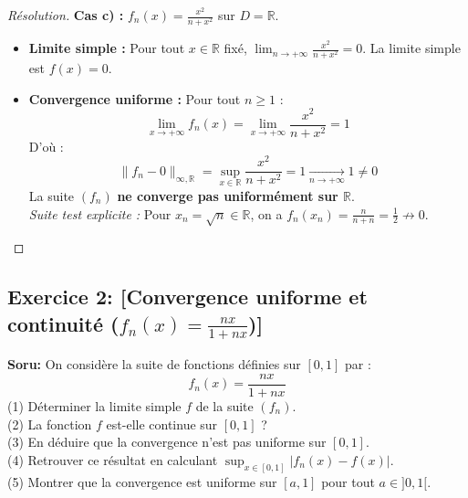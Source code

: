 \documentclass[12pt,a4paper]{report}
\begin{document}
\begin{proof}[Résolution]
\textbf{Cas c) :} $f_n(x) = \frac{x^2}{n+x^2}$ sur $D = \mathbb{R}$.
\begin{itemize}
    \item \textbf{Limite simple :}
    Pour tout $x \in \mathbb{R}$ fixé, $\lim_{n \to +\infty} \frac{x^2}{n+x^2} = 0$.
    La limite simple est $f(x) = 0$.
    \item \textbf{Convergence uniforme :}
    Pour tout $n \ge 1$ :
    \[ \lim_{x \to +\infty} f_n(x) = \lim_{x \to +\infty} \frac{x^2}{n+x^2} = 1 \]
    D'où :
    \[ \|f_n - 0\|_{\infty, \mathbb{R}} = \sup_{x \in \mathbb{R}} \frac{x^2}{n+x^2} = 1 \xrightarrow[n \to +\infty]{} 1 \neq 0 \]
    La suite $(f_n)$ \textbf{ne converge pas uniformément sur $\mathbb{R}$}.\\
    \textit{Suite test explicite :} Pour $x_n = \sqrt{n} \in \mathbb{R}$, on a $f_n(x_n) = \frac{n}{n+n} = \frac{1}{2} \not\to 0$.
\end{itemize}
\end{proof}

\subsection*{Exercice 2: [Convergence uniforme et continuité ($f_n(x) = \frac{nx}{1+nx}$)]}

\textbf{Soru:}
On considère la suite de fonctions définies sur $[0, 1]$ par :
\[ f_n(x) = \frac{nx}{1+nx} \]
(1) Déterminer la limite simple $f$ de la suite $(f_n)$.\\
(2) La fonction $f$ est-elle continue sur $[0, 1]$ ?\\
(3) En déduire que la convergence n'est pas uniforme sur $[0, 1]$.\\
(4) Retrouver ce résultat en calculant $\sup_{x \in [0, 1]} |f_n(x) - f(x)|$.\\
(5) Montrer que la convergence est uniforme sur $[a, 1]$ pour tout $a \in ]0, 1[$.
\end{document}
